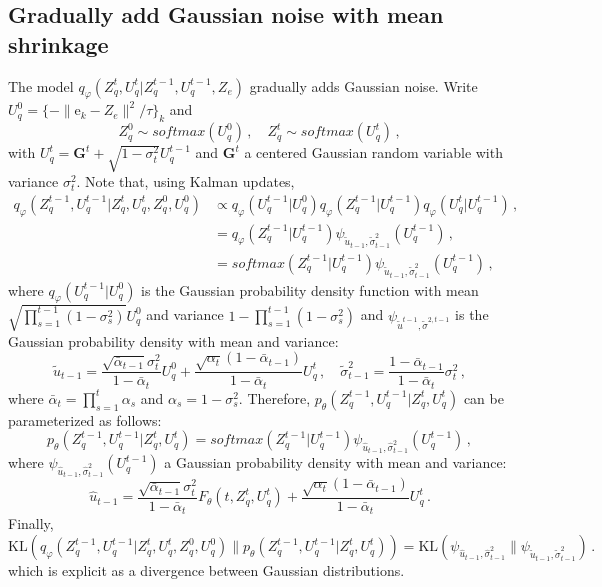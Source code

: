 \documentclass{article}
\newcommand{\rme}{\mathrm{e}}
\begin{document}
\subsection{Gradually add Gaussian noise with mean shrinkage}
The model $q_{\varphi}(Z_q^t ,U_q^t| Z_q^{t-1},U_q^{t-1}, Z_e)$ gradually adds Gaussian noise. Write $U_q^0 = \{- \| \rme_k - Z_e\|^2/ \tau\}_k $ and 
$$
Z_q^0 \sim softmax(U_q^0 )\,, \quad Z_q^t \sim softmax(U_q^t)\,,
$$
with $U_q^t = \mathbf{G}^t + \sqrt{1-\sigma_t^2}U_q^{t-1}$ and $\mathbf{G}^t$ a centered Gaussian random variable with variance $\sigma_t^2$. 
Note that, using Kalman updates, 
\begin{align*}
q_\varphi(Z_q^{t-1},U_q^{t-1}|Z_q^t,U_q^{t},Z_q^0,U_q^{0}) &\propto q_\varphi(U_q^{t-1}|U_q^{0}) q_\varphi(Z_q^{t-1}|U_q^{t-1})q_\varphi(U_q^{t}|U_q^{t-1})\,,\\
&= q_\varphi(Z_q^{t-1}|U_q^{t-1})\psi_{\tilde u_{t-1},\tilde \sigma_{t-1}^2}(U_q^{t-1})\,,\\
&= softmax(Z_q^{t-1}|U_q^{t-1})\psi_{\tilde u_{t-1},\tilde \sigma_{t-1}^2}(U_q^{t-1})\,,
\end{align*}
where $q_\varphi(U_q^{t-1}|U_q^{0})$ is the Gaussian probability density function with mean $ \sqrt{\prod_{s=1}^{t-1}(1-\sigma_s^2)}U_q^0$ and variance $1 - \prod_{s=1}^{t-1}(1-\sigma_s^2)$ and $\psi_{\tilde u^{t-1},\tilde \sigma^{2,t-1}}$ is the Gaussian probability density with mean and variance:
$$
\tilde u_{t-1} = \frac{\sqrt{\bar{\alpha}_{t-1}}\sigma_t^2}{1 - \bar{\alpha}_{t}}U_q^0 + \frac{\sqrt{\alpha_t}(1-\bar{\alpha}_{t-1})}{1-\bar{\alpha}_{t}}U_q^t\,,\quad \tilde \sigma_{t-1}^2 = \frac{1 - \bar{\alpha}_{t-1}}{1 - \bar{\alpha}_{t}}\sigma_t^2\,,
$$
where $ \bar{\alpha}_{t} = \prod_{s=1}^{t}\alpha_s$ and $\alpha_s = 1-\sigma_s^2$. Therefore, $p_\theta(Z_q^{t-1},U_q^{t-1}|Z_q^t,U_q^t)$ can be parameterized as follows:
$$
p_\theta(Z_q^{t-1},U_q^{t-1}|Z_q^t,U_q^t) = softmax(Z_q^{t-1}|U_q^{t-1})\psi_{\hat u_{t-1},\hat \sigma_{t-1}^2}(U_q^{t-1})\,,
$$
where $\psi_{\hat u_{t-1},\hat \sigma_{t-1}^2}(U_q^{t-1})$ a Gaussian probability density with mean and variance:
$$
\hat u_{t-1} = \frac{\sqrt{\bar{\alpha}_{t-1}}\sigma_t^2}{1 - \bar{\alpha}_{t}}F_\theta(t,Z_q^t,U_q^t) + \frac{\sqrt{\alpha_t}(1-\bar{\alpha}_{t-1})}{1-\bar{\alpha}_{t}}U_q^t \,.
$$
Finally,
$$
\mathrm{KL}(q_\varphi(Z_q^{t-1},U_q^{t-1}|Z_q^t,U_q^{t},Z_q^0,U_q^{0})\|p_\theta(Z_q^{t-1},U_q^{t-1}|Z_q^t,U_q^t)) = \mathrm{KL}(\psi_{\hat u_{t-1},\hat \sigma_{t-1}^2}\|\psi_{\tilde u_{t-1},\tilde \sigma_{t-1}^2})\,.
$$
which is explicit as a divergence between Gaussian distributions.
\end{document}
